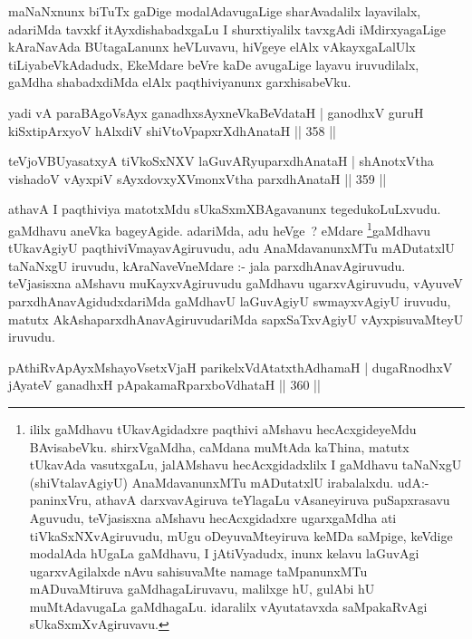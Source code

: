 \begin{artha}
maNaNxnunx biTuTx gaDige modalAdavugaLige sharAvadalilx layavilalx, adariMda tavxkf itAyxdishabadxgaLu I shurxtiyalilx tavxgAdi iMdirxyagaLige kAraNavAda BUtagaLanunx heVLuvavu, hiVgeye elAlx vAkayxgaLalUlx tiLiyabeVkAdadudx, EkeMdare beVre kaDe avugaLige layavu iruvudilalx, gaMdha shabadxdiMda elAlx paqthiviyanunx garxhisabeVku.
\end{artha}

\begin{shl}
yadi vA paraBAgoV\s sAyx ganadhxsAyxneVkaBeVdataH |
ganodhxV guruH kiSxtipArxyoV hAlxdiV shiVtoV\s papxrXdhAnataH \hfill || 358 ||
\end{shl}

\begin{shl}
teVjoVBUyasatxyA tiVkoSxNXV laGuvARyuparxdhAnataH |
shAnotxV\s tha vishadoV vAyxpiV sAyxdovxyXVmonxV\s tha parxdhAnataH \hfill || 359 ||
\end{shl}

\begin{artha}
athavA I paqthiviya matotxMdu sUkaSxmXBAgavanunx tegedukoLuLxvudu. gaMdhavu aneVka bageyAgide. adariMda, adu heVge~? eMdare \ndash \footnote{ililx gaMdhavu tUkavAgidadxre paqthivi aMshavu hecAcxgideyeMdu BAvisabeVku. shirxVgaMdha, caMdana muMtAda kaThina, matutx tUkavAda vasutxgaLu, jalAMshavu hecAcxgidadxlilx I gaMdhavu taNaNxgU (shiVtalavAgiyU) AnaMdavanunxMTu mADutatxlU irabalalxdu. udA:- paninxVru, athavA darxvavAgiruva teYlagaLu vAsaneyiruva puSapxrasavu Aguvudu, teVjasisxna aMshavu hecAcxgidadxre ugarxgaMdha ati tiVkaSxNXvAgiruvudu, mUgu oDeyuvaMteyiruva keMDa saMpige, keVdige modalAda hUgaLa gaMdhavu, I jAtiVyadudx, inunx kelavu laGuvAgi ugarxvAgilalxde nAvu sahisuvaMte namage taMpanunxMTu mADuvaMtiruva gaMdhagaLiruvavu, malilxge hU, gulAbi hU muMtAdavugaLa gaMdhagaLu. idaralilx vAyutatavxda saMpakaRvAgi sUkaSxmXvAgiruvavu.}gaMdhavu tUkavAgiyU paqthiviVmayavAgiruvudu, adu AnaMdavanunxMTu mADutatxlU taNaNxgU iruvudu, kAraNaveVneMdare :- jala parxdhAnavAgiruvudu. teVjasisxna aMshavu muKayxvAgiruvudu gaMdhavu ugarxvAgiruvudu, vAyuveV parxdhAnavAgidudxdariMda gaMdhavU laGuvAgiyU swmayxvAgiyU iruvudu, matutx AkAshaparxdhAnavAgiruvudariMda sapxSaTxvAgiyU vAyxpisuvaMteyU iruvudu.
\end{artha}


\begin{shl}
pAthiRvApAyxMshayoVsetxVjaH parikelxVdAtatxthA\s dhamaH |
dugaRnodhxV jAyateV ganadhxH pApakamaRparxboVdhataH \hfill || 360 ||
\end{shl}

